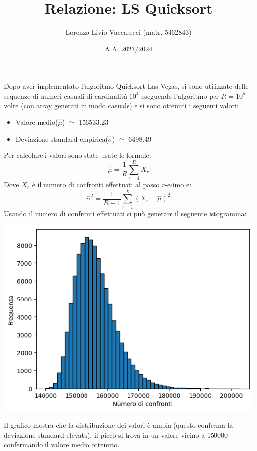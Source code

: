 \documentclass[12pt]{article}
\title{Relazione: LS Quicksort}
\author{Lorenzo Livio Vaccarecci (matr. 5462843)}
\date{A.A. 2023/2024}
\begin{document}
\maketitle

Dopo aver implementato l'algoritmo Quicksort Las Vegas, 
si sono utilizzate delle sequenze di numeri casuali di 
cardinalità $10^{4}$ eseguendo l'algoritmo per $R=10^{5}$ 
volte (con array generati in modo casuale) e si sono ottenuti i seguenti valori:
\begin{itemize}
    \item Valore medio($\hat{\mu}$) $\simeq $ 156533.23
    \item Deviazione standard empirica($\hat{\sigma}$) $\simeq$ 6498.49
\end{itemize}
Per calcolare i valori sono state usate le formule:
\begin{equation*}
    \hat{\mu} = \frac{1}{R}\sum_{r=1}^{R}X_{r} 
\end{equation*}
Dove $X_{r}$ è il numero di confronti effettuati al passo $r$-esimo e:
\begin{equation*}
    \hat{\sigma}^{2} = \frac{1}{R-1}\sum_{r=1}^{R}(X_{r}-\hat{\mu})^{2}
\end{equation*}
Usando il numero di confronti effettuati si può generare il seguente 
istogramma:
\begin{center}
    \includegraphics[scale=0.8]{Istogramma.png}
\end{center}
Il grafico mostra che la distribuzione dei valori è ampia (questo 
conferma la deviazione standard elevata), il picco si trova in un 
valore vicino a 150000 confermando il valore medio ottenuto.
\end{document}
